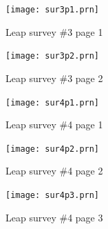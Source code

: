 \begin{figure}[htbp]
  \centering
  \texttt{[image: sur3p1.prn]}
  \caption{Leap survey \#3 page 1}
  \label{fig:survey3.1}
\end{figure}
\begin{figure}[htbp]
  \centering
  \texttt{[image: sur3p2.prn]}
  \caption{Leap survey \#3 page 2}
  \label{fig:survey3.2}
\end{figure}

\begin{figure}[htbp]
  \centering
  \texttt{[image: sur4p1.prn]}
  \caption{Leap survey \#4 page 1}
  \label{fig:survey4.1}
\end{figure}
\begin{figure}[htbp]
  \centering
  \texttt{[image: sur4p2.prn]}
  \caption{Leap survey \#4 page 2}
  \label{fig:survey4.2}
\end{figure}

\begin{figure}[htbp]
  \centering
  \texttt{[image: sur4p3.prn]}
  \caption{Leap survey \#4 page 3}
  \label{fig:survey4.3}
\end{figure}


